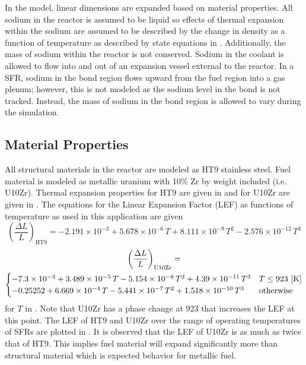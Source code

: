   In the model, linear dimensions are expanded based on material properties.
  All sodium in the reactor is assumed to be liquid so effects of thermal
  expansion within the sodium are assumed to be described by the change in
  density as a function of temperature as described by state equations in
  \cite{sodiumProp}. Additionally, the mass of sodium within the reactor is not
  conserved. Sodium in the coolant is allowed to flow into and out of an
  expansion vessel external to the reactor. In a SFR, sodium in the bond region
  flows upward from the fuel region into a gas plenum; however, this is not
  modeled as the sodium level in the bond is not tracked. Instead, the mass of
  sodium in the bond region is allowed to vary during the simulation.

  \subsection{Material Properties}
    \label{sec:model_details__material_properties}
    All structural materials in the reactor are modeled as HT9 stainless steel.
    Fuel material is modeled as metallic uranium with 10\% Zr by weight included
    (i.e. U10Zr). Thermal expansion properties for HT9 are given in 
    \cite{ht9Prop} and for U10Zr are given in \cite{thexpU10Zr}. The equations 
    for the Linear Expansion Factor (LEF) as functions of temperature as used in
    this application are given
    \begin{equation}
      \label{eq:lef_ht9}
      \left( \frac{\Delta L}{L} \right)_{\text{HT9}} = 
        -2.191 \times 10^{-3} + 5.678 \times 10^{-6} \, T + 
        8.111 \times 10^{-9} \, T^2 - 2.576 \times 10^{-12} \, T^3 
    \end{equation}
    \begin{multline}
      \label{eq:lef_u10zr}
      \left( \frac{\Delta L}{L} \right)_{\text{U10Zr}} = \\
        \begin{cases}
          -7.3 \times 10^{-3} + 3.489 \times 10^{-5} \, T 
            - 5.154 \times 10^{-8} \, T^2 + 4.39 \times 10^{-11} \, T^3 & 
            T \le 923 \,\left[\text{{K}}\right] \\
          -0.25252 + 6.669 \times 10^{-4} \, T - 5.441 \times 10^{-7} \, T^2 
            + 1.518 \times 10^{-10} \, T^3 & \text{otherwise}
        \end{cases}
    \end{multline}
    for $T$ in . Note that U10Zr has a phase change at 923  
    that increases the LEF at this point. The LEF of HT9 and U10Zr over the 
    range of operating temperatures of SFRs are plotted in . 
    It is observed that the LEF of U10Zr is as much as twice that of HT9. This 
    implies fuel material will expand significantly more than structural 
    material which is expected behavior for metallic fuel.


